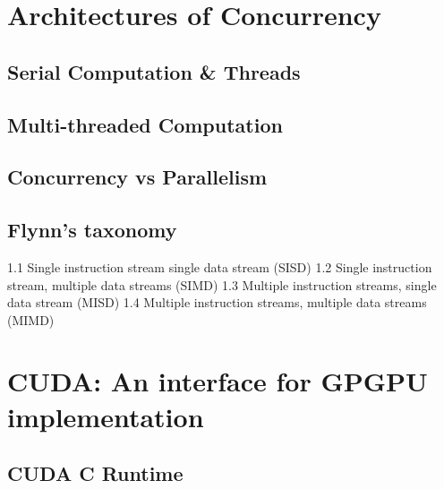 \section{Architectures of Concurrency}
%
\subsection{Serial Computation \& Threads}
%
\subsection{Multi-threaded Computation}
%
\subsection{Concurrency vs Parallelism}
%
\subsection{Flynn's taxonomy}
1.1	Single instruction stream single data stream (SISD)
1.2	Single instruction stream, multiple data streams (SIMD)
1.3	Multiple instruction streams, single data stream (MISD)
1.4	Multiple instruction streams, multiple data streams (MIMD)
%
\section{CUDA: An interface for GPGPU implementation}
\subsection{CUDA C Runtime}%

